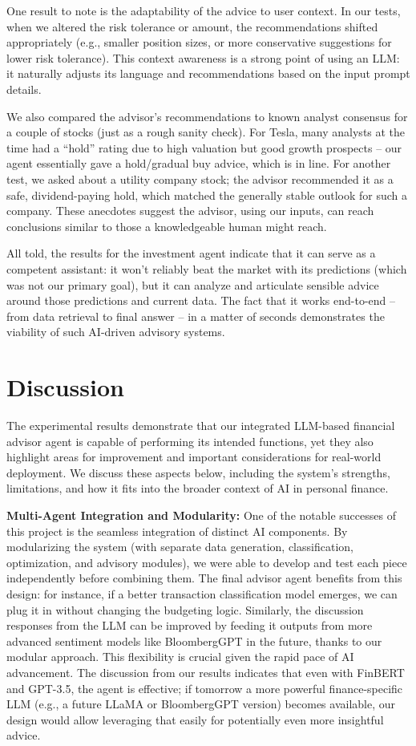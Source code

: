 \documentclass{scrartcl}
\begin{document}
One result to note is the adaptability of the advice to user context. In our tests, when we altered the risk tolerance or amount, the recommendations shifted appropriately (e.g., smaller position sizes, or more conservative suggestions for lower risk tolerance). This context awareness is a strong point of using an LLM: it naturally adjusts its language and recommendations based on the input prompt details.

We also compared the advisor’s recommendations to known analyst consensus for a couple of stocks (just as a rough sanity check). For Tesla, many analysts at the time had a “hold” rating due to high valuation but good growth prospects – our agent essentially gave a hold/gradual buy advice, which is in line. For another test, we asked about a utility company stock; the advisor recommended it as a safe, dividend-paying hold, which matched the generally stable outlook for such a company. These anecdotes suggest the advisor, using our inputs, can reach conclusions similar to those a knowledgeable human might reach.

All told, the results for the investment agent indicate that it can serve as a competent assistant: it won’t reliably beat the market with its predictions (which was not our primary goal), but it can analyze and articulate sensible advice around those predictions and current data. The fact that it works end-to-end – from data retrieval to final answer – in a matter of seconds demonstrates the viability of such AI-driven advisory systems.

\section{Discussion}
The experimental results demonstrate that our integrated LLM-based financial advisor agent is capable of performing its intended functions, yet they also highlight areas for improvement and important considerations for real-world deployment. We discuss these aspects below, including the system’s strengths, limitations, and how it fits into the broader context of AI in personal finance.

\textbf{Multi-Agent Integration and Modularity:} One of the notable successes of this project is the seamless integration of distinct AI components. By modularizing the system (with separate data generation, classification, optimization, and advisory modules), we were able to develop and test each piece independently before combining them. The final advisor agent benefits from this design: for instance, if a better transaction classification model emerges, we can plug it in without changing the budgeting logic. Similarly, the discussion responses from the LLM can be improved by feeding it outputs from more advanced sentiment models like BloombergGPT in the future, thanks to our modular approach. This flexibility is crucial given the rapid pace of AI advancement. The discussion from our results indicates that even with FinBERT and GPT-3.5, the agent is effective; if tomorrow a more powerful finance-specific LLM (e.g., a future LLaMA or BloombergGPT version) becomes available, our design would allow leveraging that easily for potentially even more insightful advice.
\end{document}
